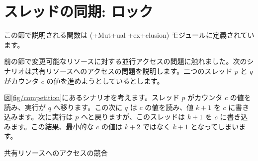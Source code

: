 \section{スレッドの同期: ロック}
この節で説明される関数は  (\ml+Mut+ual \ml+ex+clusion) モジュールに定義されています。

前の節で変更可能なリソースに対する並行アクセスの問題に触れました。次のシナリオは共有リソースへのアクセスの問題を説明します。二つのスレッド $p$ と $q$ がカウンタ $c$ の値を進めようとしているとします。

図\ref {fig/competition}にあるシナリオを考えます。スレッド $p$ がカウンタ $c$ の値を読み、実行が $q$ へ移ります。この次に $q$ は $c$ の値を読み、値 $k+1$ を $c$ に書き込みます。次に実行は $p$ へと戻りますが、このスレッドは $k+1$ を $c$ に書き込みます。この結果、最小的な $c$ の値は $k+2$ ではなく $k+1$ となってしまいます。
\begin{myfigure}
\begin{myimage}[width="100\%"]
\end{myimage}
\caption {共有リソースへのアクセスの競合}
\label{fig/competition}
\end{myfigure}

